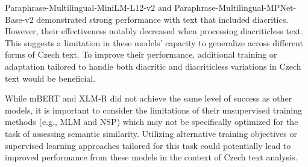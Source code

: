 Paraphrase-Multilingual-MiniLM-L12-v2 and Paraphrase-Multilingual-MPNet-Base-v2 demonstrated strong performance with text that included diacritics.
However, their effectiveness notably decreased when processing diacriticless text.
This suggests a limitation in these models' capacity to generalize across different forms of Czech text.
To improve their performance, additional training or adaptation tailored to handle both diacritic and diacriticless variations in Czech text would be beneficial.

While \ac{mBERT} and \ac{XLM-R} did not achieve the same level of success as other models, it is important to consider the limitations of their unsupervised training methods (e.g., \ac{MLM} and \ac{NSP}) which may not be specifically optimized for the task of assessing semantic similarity.
Utilizing alternative training objectives or supervised learning approaches tailored for this task could potentially lead to improved performance from these models in the context of Czech text analysis.

\FloatBarrier

\FloatBarrier

